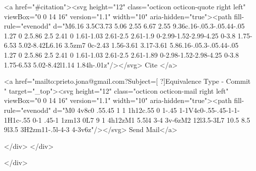       <a  href="#citation"><svg height="12" class="octicon octicon-quote right left" viewBox="0 0 14 16" version="1.1" width="10" aria-hidden="true"><path fill-rule="evenodd" d="M6.16 3.5C3.73 5.06 2.55 6.67 2.55 9.36c.16-.05.3-.05.44-.05 1.27 0 2.5.86 2.5 2.41 0 1.61-1.03 2.61-2.5 2.61-1.9 0-2.99-1.52-2.99-4.25 0-3.8 1.75-6.53 5.02-8.42L6.16 3.5zm7 0c-2.43 1.56-3.61 3.17-3.61 5.86.16-.05.3-.05.44-.05 1.27 0 2.5.86 2.5 2.41 0 1.61-1.03 2.61-2.5 2.61-1.89 0-2.98-1.52-2.98-4.25 0-3.8 1.75-6.53 5.02-8.42l1.14 1.84h-.01z"/></svg> Cite
      </a>

      <a href="mailto:prieto.jona@gmail.com?Subject=[ ?]Equivalence Type - Commit " target="_top"><svg height="12" class="octicon octicon-mail right left" viewBox="0 0 14 16" version="1.1" width="10" aria-hidden="true"><path fill-rule="evenodd" d="M0 4v8c0 .55.45 1 1 1h12c.55 0 1-.45 1-1V4c0-.55-.45-1-1-1H1c-.55 0-1 .45-1 1zm13 0L7 9 1 4h12zM1 5.5l4 3-4 3v-6zM2 12l3.5-3L7 10.5 8.5 9l3.5 3H2zm11-.5l-4-3 4-3v6z"/></svg> Send Mail</a>

    </div>
  </div>

</div>




